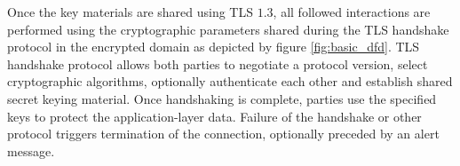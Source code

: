 



\begin{comment}
\begin{figure}[!ht]
    \centering
    \begin{tikzpicture}

        \draw (-12,0) circle [radius=.4]; %
        \draw (-12.3,-.7) -- (-11.7,-.7);  %
        \draw (-12,-.4) -- (-12,-1.4); %
        \draw (-12,-1.4) -- (-12.4,-2.2); %
        \draw (-12,-1.4) -- (-11.6,-2.2); %
        \node at (-12,-2.5) {$\textbf{User}$}; %

        \draw (-9,-1.5) -- (-6,-1.5) -- (-6,0) -- (-9,0) -- (-9,-1.5);
        \node at (-8,-.5) {Client};
        \node at (-7.6,-1) {Query Portal};

        \draw (-8.5,1.75) -- (-6.5,1.75);
        \draw (-8.5,1.25) -- (-6.5,1.25);
        \node at (-7.5,1.5) {KMS};

        \draw [<->](-11.4,-.8) -- (-9,-.8);
        \node at (-10.3,-.5) {Encrypted};
        \node at (-10.2,-1) {communication};

        \draw [<->](-7.5,1.25) -- (-7.5,0);

    \end{tikzpicture}
    \caption{Interaction between user and the client query portal}
    \label{fig_user_Client_query_portal_interactions}
\end{figure}
\end{comment}






Once the key materials are shared using TLS $1.3$, all followed interactions are performed using the cryptographic parameters shared during the TLS handshake protocol in the encrypted domain as depicted by figure \ref{fig:basic_dfd}. TLS handshake protocol allows both parties to negotiate a protocol version, select cryptographic algorithms, optionally authenticate each other and establish shared secret keying material. Once handshaking is complete, parties use the specified keys to protect the application-layer data. Failure of the handshake or other protocol triggers termination of the connection, optionally preceded by an alert message.


